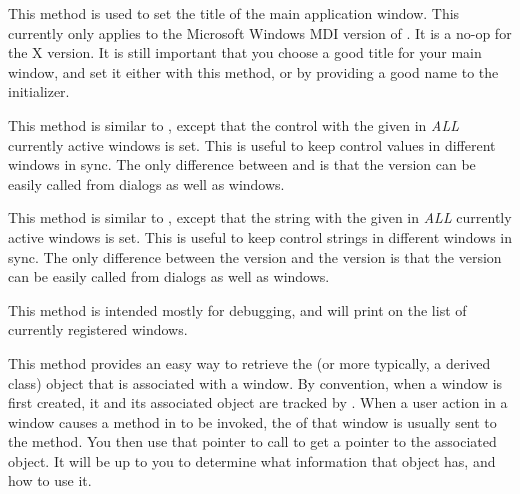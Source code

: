 
This method is used to set the title of the main application
window. This currently only applies to the Microsoft Windows
MDI version of \V. It is a no-op for the X version. It is still
important that you choose a good title for your main window,
and set it either with this method, or by providing a good
name to the  initializer.


This method is similar to , except that
the control with the given  in \emph{ALL} currently
active windows is set. This is useful to keep control values
in different windows in sync. The only difference between
 and  is
that the  version can be easily called from dialogs
as well as windows.


This method is similar to , except that
the string with the given  in \emph{ALL} currently
active windows is set. This is useful to keep control strings
in different windows in sync. The only difference between the
 version and the 
version is that the  version can be easily called from
dialogs as well as windows.


This method is intended mostly for debugging, and will print
on  the list of currently registered windows.


This method provides an easy way to retrieve the 
(or more typically, a derived class) object that is associated
with a window.  By convention, when a window is first created,
it and its associated  object are tracked by
. When a user action in a window causes a method
in  to be invoked, the  of that window is
usually sent to the  method.  You then use that
 pointer to call  to get a
pointer to the associated  object. It will be
up to you to determine what information that object has, and how
to use it.

